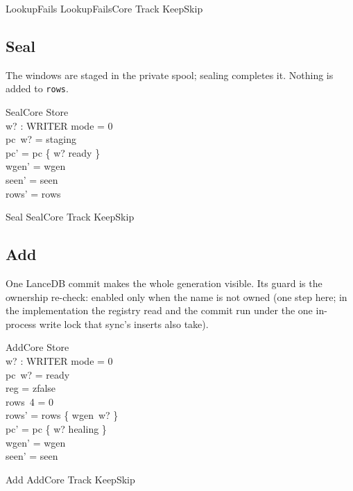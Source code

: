 \documentclass[a4paper,10pt,fleqn]{article}
\newcommand{\field}[1]{\texttt{#1}}
\begin{document}
\begin{zed}
LookupFails  LookupFailsCore \land Track \land KeepSkip
\end{zed}

\subsection{Seal}

The windows are staged in the private spool; sealing completes it. Nothing is
added to \field{rows}.

\begin{schema}{SealCore}
\Delta Store \\ w? : WRITER
\where
mode = 0 \\
pc~w? = staging \\
pc' = pc \oplus \{ w? \mapsto ready \} \\
wgen' = wgen \\
seen' = seen \\
rows' = rows
\end{schema}

\begin{zed}
Seal  SealCore \land Track \land KeepSkip
\end{zed}

\subsection{Add}

One LanceDB commit makes the whole generation visible. Its guard is the
ownership re-check: enabled only when the name is not owned (one step here; in
the implementation the registry read and the commit run under the one
in-process write lock that sync's inserts also take).

\begin{schema}{AddCore}
\Delta Store \\ w? : WRITER
\where
mode = 0 \\
pc~w? = ready \\
reg = zfalse \\
rows~4 = 0 \\
rows' = rows \oplus \{ wgen~w?  \} \\
pc' = pc \oplus \{ w? \mapsto healing \} \\
wgen' = wgen \\
seen' = seen
\end{schema}

\begin{zed}
Add  AddCore \land Track \land KeepSkip
\end{zed}
\end{document}
